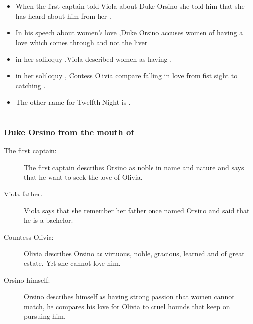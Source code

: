 \documentclass[12pt, a4paper]{article}
\begin{document}
\begin{itemize}
  \item[\ding{99}] When the first captain told Viola about Duke Orsino she told him that she has heard about him from her .

  \item[\ding{99}] In his speech about women's love ,Duke Orsino accuses women of having a love which comes through  and not the liver

  \item[\ding{99}] in her soliloquy ,Viola described women as having .

  \item[\ding{99}] in her soliloquy , Contess Olivia compare falling in love from fist sight to catching .

  \item[\ding{99}] The other name for Twelfth Night is .
\end{itemize}


 

\section*{}\bigbreak

\subsubsection*{Duke Orsino from the mouth of}

\begin{description}
  \item[The first captain:] The first captain describes Orsino as noble in name and nature
and says that he want to seek the love of Olivia.

  \item[Viola father:] Viola says that she remember her father once named Orsino and said that 
    he is a bachelor.

  \item[Countess Olivia:] Olivia describes Orsino as virtuous, noble, gracious, 
    learned and of great estate. Yet she cannot love him.

  \item[Orsino himself:] Orsino describes himself as having strong passion that women cannot match,
    he compares his love for Olivia to cruel hounds that keep on pursuing him.
\end{description}
\end{document}

